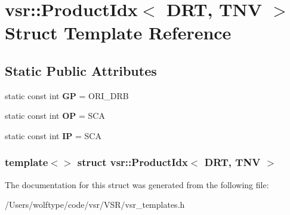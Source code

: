 \hypertarget{structvsr_1_1_product_idx_3_01_d_r_t_00_01_t_n_v_01_4}{\section{vsr\-:\-:Product\-Idx$<$ D\-R\-T, T\-N\-V $>$ Struct Template Reference}
\label{structvsr_1_1_product_idx_3_01_d_r_t_00_01_t_n_v_01_4}
}
\subsection*{Static Public Attributes}
\begin{DoxyCompactItemize}
\item 
\hypertarget{structvsr_1_1_product_idx_3_01_d_r_t_00_01_t_n_v_01_4_ad27b2c90517247b37da69bcd4947e1ce}{static const int {\bfseries G\-P} = O\-R\-I\-\_\-\-D\-R\-B}\label{structvsr_1_1_product_idx_3_01_d_r_t_00_01_t_n_v_01_4_ad27b2c90517247b37da69bcd4947e1ce}

\item 
\hypertarget{structvsr_1_1_product_idx_3_01_d_r_t_00_01_t_n_v_01_4_a72509af4dc2a9d53c814fe91aa6ef7f0}{static const int {\bfseries O\-P} = S\-C\-A}\label{structvsr_1_1_product_idx_3_01_d_r_t_00_01_t_n_v_01_4_a72509af4dc2a9d53c814fe91aa6ef7f0}

\item 
\hypertarget{structvsr_1_1_product_idx_3_01_d_r_t_00_01_t_n_v_01_4_a70b15b1da7efe56387a65afd59efda57}{static const int {\bfseries I\-P} = S\-C\-A}\label{structvsr_1_1_product_idx_3_01_d_r_t_00_01_t_n_v_01_4_a70b15b1da7efe56387a65afd59efda57}

\end{DoxyCompactItemize}
\subsubsection*{template$<$$>$ struct vsr\-::\-Product\-Idx$<$ D\-R\-T, T\-N\-V $>$}



The documentation for this struct was generated from the following file\-:\begin{DoxyCompactItemize}
\item 
/\-Users/wolftype/code/vsr/\-V\-S\-R/vsr\-\_\-templates.\-h\end{DoxyCompactItemize}

